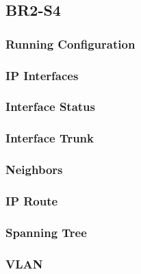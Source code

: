 \subsection{BR2-S4}
\subsubsection{Running Configuration}


\subsubsection{IP Interfaces}


\subsubsection{Interface Status}


\subsubsection{Interface Trunk}


\subsubsection{Neighbors}


\subsubsection{IP Route}


\subsubsection{Spanning Tree}


\subsubsection{VLAN}

